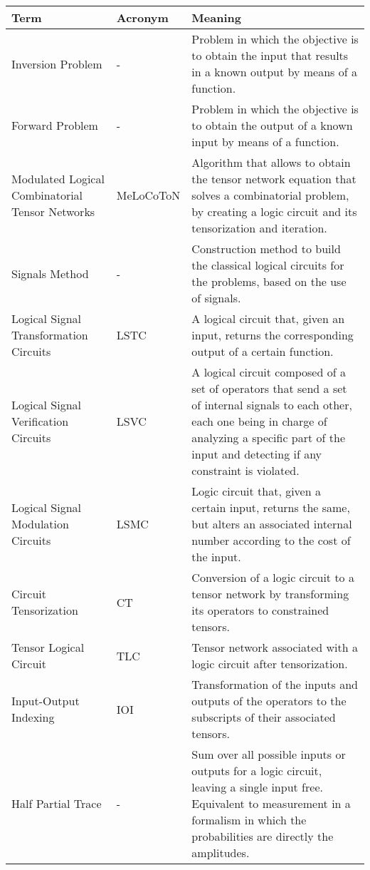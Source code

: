 \begin{table}[h]
    \centering
    \begin{tabular}{|p{4cm}|l|p{8cm}|}
         \hline
         Term & Acronym & Meaning \\
         \hline
         Inversion Problem & - & Problem in which the objective is to obtain the input that results in a known output by means of a function.\\
         \hline
         Forward Problem & - & Problem in which the objective is to obtain the output of a known input by means of a function.\\
         \hline
         Modulated Logical Combinatorial Tensor Networks& MeLoCoToN & Algorithm that allows to obtain the tensor network equation that solves a combinatorial problem, by creating a logic circuit and its tensorization and iteration.\\
         \hline
         Signals Method & - & Construction method to build the classical logical circuits for the problems, based on the use of signals.\\
         \hline
         Logical Signal Transformation Circuits & LSTC & A logical circuit that, given an input, returns the corresponding output of a certain function. \\
         \hline
         Logical Signal Verification Circuits & LSVC & A logical circuit composed of a set of operators that send a set of internal signals to each other, each one being in charge of analyzing a specific part of the input and detecting if any constraint is violated.\\
         \hline
         Logical Signal Modulation Circuits & LSMC & Logic circuit that, given a certain input, returns the same, but alters an associated internal number according to the cost of the input. \\
         \hline
         Circuit Tensorization& CT & Conversion of a logic circuit to a tensor network by transforming its operators to constrained tensors. \\
         \hline
         Tensor Logical Circuit & TLC & Tensor network associated with a logic circuit after tensorization. \\
         \hline
         Input-Output Indexing & IOI & Transformation of the inputs and outputs of the operators to the subscripts of their associated tensors. \\
         \hline
         Half Partial Trace & - & Sum over all possible inputs or outputs for a logic circuit, leaving a single input free. Equivalent to measurement in a formalism in which the probabilities are directly the amplitudes.\\

\end{tabular}
\end{table}
